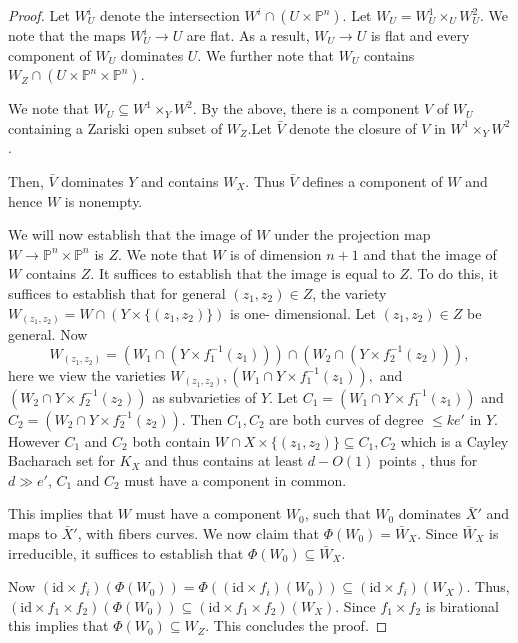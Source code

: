 \documentclass[12pt]{amsart}
\numberwithin{equation}{section}
\numberwithin{theorem}{section}
\theoremstyle{definition}
\theoremstyle{definition}
\def\PP{{\mathbb{P}}}
\def\id{{\mathrm{id}}}
\begin{document}
\begin{proof}
    
    Let $W^i_U$ denote the intersection $W^i \cap (U \times \PP^n).$  Let $W_U = W^1_U \times_U W^2_U$.
    We note that  the maps $W^i_U \to U$ are flat. As a result, $W_U \to U$ is flat and every component of $W_U$ dominates $U$.  We further note that $W_U$ contains $W_Z \cap (U \times \PP^n \times \PP^n)$.  

    We note that $W_U \subseteq W^1 \times_Y W^2$. By the above, there is  a component $V$ of $W_U$ containing a Zariski open subset of $W_Z$.Let $\bar V$ denote the closure of $V$ in $W^1 \times_Y W^2$.
    
    Then, $\bar V$ dominates $Y$ and contains $W_X$. Thus $\bar V$ defines a component of $W$ and hence $W$ is nonempty.
    
   
   We will now establish that the image of $W $ under the projection  map $W\to \PP^n \times \PP^n$  is $Z$.
   We note that $W $ is of dimension $n+1$ and that the image of $W$ contains $Z$. It suffices to establish that the image is equal to $Z$. To do this, it suffices to establish that for general $(z_1, z_2) \in Z$, the variety $W_{(z_1, z_2)} = W \cap (Y \times \{(z_1, z_2)\})$ is one- dimensional.
     Let $(z_1 , z_2) \in Z$ be general. Now $$W_{(z_1, z_2)} = (W_1 \cap (Y \times f_1^{-1}(z_1))) \cap (W_2 \cap (Y \times f_2^{-1}(z_2))),$$ here we view  the varieties  $W_{(z_1, z_2)}, (W_1 \cap Y \times f_1^{-1}(z_1)), $ and $ (W_2 \cap Y \times f_2^{-1}(z_2)) $ as subvarieties of $Y$.  Let $ C_1 = (W_1 \cap Y \times f_1^{-1}(z_1))$ and $C_2 = (W_2 \cap Y \times f_2^{-1}(z_2))$. Then $C_1, C_2$ are both curves of degree  $\le ke'$ in $Y$.    However $C_1$ and $C_2$ both contain $W \cap X  \times \{(z_1, z_2)\}\subseteq C_1, C_2 $ which is a Cayley Bacharach set for $K_X$ and thus contains at least $d -O(1)$ points , thus for $d \gg e'$, $C_1$ and $C_2$ must have a component in common. 

         This implies that $W$ must have a component $W_0$, such that $W_0$ dominates $\bar X'$ and maps to $\bar X'$, with fibers curves.
         We now  claim that $\Phi(W_0) = \bar W_X$. Since $\bar W_X$ is irreducible, it suffices to establish that $\Phi(W_0) \subseteq  \bar W_X$.

         Now $(\id \times f_i)(\Phi(W_0))= \Phi((\id \times f_i)(W_0)) \subseteq (\id \times f_i)(W_X)$. Thus, $(\id \times f_1 \times f_2)(\Phi(W_0)) \subseteq (\id \times  f_1 \times f_2)(W_X) .$ Since $f_1 \times f_2$ is birational this implies that $\Phi(W_0) \subseteq   W_Z$. This concludes the proof.
 
\end{proof}
\end{document}
